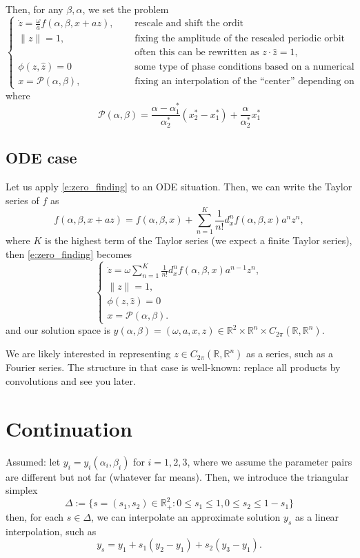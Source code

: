 \documentclass[10pt]{article}
\begin{document}
Then, for any $\beta, \alpha$, we set the problem
\begin{equation}\label{e:zero_finding}
\begin{cases}
\dot z = \frac{\omega}{a} f(\alpha, \beta, x + az),\quad &\text{ rescale and shift the ordit}\\
\| z\| = 1, \quad&\text{ fixing the amplitude of the rescaled periodic orbit}\\
& \text{ often this can be rewritten as } z\cdot \hat z = 1,\\
\phi(z, \hat z) = 0 &\text{ some type of phase conditions based on a numerical solution}\\
x = \mathcal{P}(\alpha,\beta), \quad &\text{ fixing an interpolation of the ``center'' depending on the parameters}
\end{cases}
\end{equation}
where
$$
\mathcal{P}(\alpha,\beta) = \frac{\alpha - \alpha_1^*}{\alpha^*_2} (x_2^*-x_1^*) + \frac{\alpha}{\alpha_2^*} x_1^*
$$



\subsection{ODE case}
Let us apply \eqref{e:zero_finding} to an ODE situation. Then, we can write the Taylor series of $f$ as
$$
f(\alpha, \beta, x+az) = f(\alpha, \beta, x) + \sum_{n=1}^K \frac{1}{n!} d^n_xf(\alpha, \beta, x) a^n z^n,
$$
where $K$ is the highest term of the Taylor series (we expect a finite Taylor series), then \eqref{e:zero_finding} becomes
\begin{equation}\label{e:better_zero_finding}
\begin{cases}
\dot z = \omega\sum_{n=1}^K\frac{1}{n!} d^n_xf(\alpha, \beta, x) a^{n-1} z^n,\\
\| z\| = 1, \\
\phi(z, \hat z) = 0\\
x = \mathcal{P}(\alpha,\beta).
\end{cases}
\end{equation}
and our solution space is $y(\alpha, \beta) = ( \omega, a, x, z) \in \mathbb{R}^2 \times \mathbb{R}^n \times C_{2\pi}(\mathbb{R},\mathbb{R}^n)$.

We are likely interested in representing  $z\in C_{2\pi}(\mathbb{R},\mathbb{R}^n)$ as a series, such as a Fourier series.
The structure in that case is well-known: replace all products by convolutions and see you later.

\section{Continuation}
Assumed: let $y_i=y_i(\alpha_i, \beta_i)$ for $i=1, 2, 3$, where we assume the parameter pairs are different but not far (whatever far means). Then, we introduce the triangular simplex
$$
\Delta := \{ s= (s_1, s_2) \in \mathbb{R}^2_+: 0\leq s_1\leq 1, 0\leq s_2 \leq 1-s_1\}
$$
then, for each  $s\in\Delta$, we can interpolate an approximate solution $y_s$ as a linear interpolation, such as
$$
y_s =  y_1 + s_1(y_2-y_1) + s_2(y_3-y_1).
$$
\end{document}
